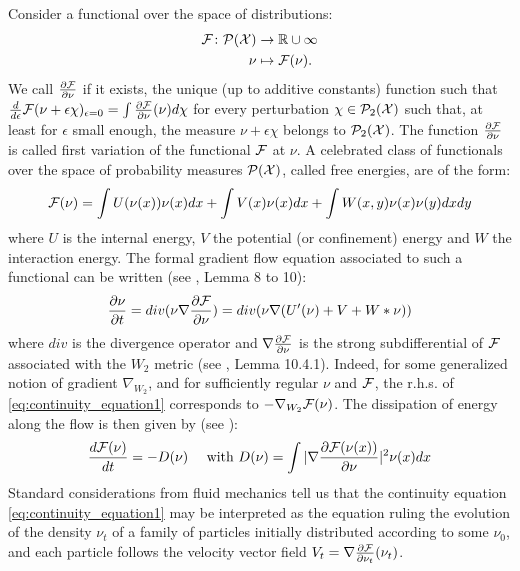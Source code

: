 Consider a functional over the space of distributions:
\begin{align*}
{{\mathcal F}} \colon \mathcal{P}({{\mathcal X}}) &\to {{\mathbb R}} \cup \infty\\
\nu &\mapsto {{\mathcal F}}(\nu).
\end{align*}
We call $\frac{\partial{{{\mathcal F}}}}{\partial{\nu}}$ if it exists, the unique (up to additive constants) function such that $\frac{d}{d\epsilon}{{\mathcal F}}(\nu+\epsilon  \chi)_{\epsilon=0}=\int\frac{\partial{{{\mathcal F}}}}{\partial{\nu}}(\nu) d\chi$ for every perturbation $\chi \in \mathcal{P}_2({{\mathcal X}})$ such that, at least for $\epsilon$ small enough, the measure $\nu +\epsilon \chi$ belongs to $\mathcal{P}_2({{\mathcal X}})$. The function $\frac{\partial{{{\mathcal F}}}}{\partial{\nu}}$ is called first variation of the functional ${{\mathcal F}}$ at $\nu$. 
A celebrated class of functionals over the space of probability measures $\mathcal{P}({{\mathcal X}})$, called free energies, are of the form:
\begin{equation}\label{eq:lyapunov}
{{\mathcal F}}(\nu)=\int U(\nu(x)) \nu(x)dx + \int V(x)\nu(x)dx + \int W(x,y)\nu(x)\nu(y)dxdy
\end{equation}
where  $U$ is the internal energy, $V$ the potential (or confinement) energy and $W$ the
interaction energy. The formal gradient flow equation associated to such a functional can be written (see \cite{carrillo2006contractions}, Lemma 8 to 10):
\begin{equation}\label{eq:continuity_equation1}
\frac{\partial \nu}{\partial t}= div( \nu \nabla \frac{\partial {{\mathcal F}}}{\partial \nu})=div( \nu \nabla (U'(\nu) + V + W * \nu))
\end{equation}
where $div$ is the divergence operator and $\nabla \frac{\partial {{\mathcal F}}}{\partial \nu}$ is the strong subdifferential of ${{\mathcal F}}$ associated with the $W_2$ metric (see \cite{ambrosio2008gradient}, Lemma 10.4.1). Indeed, for some generalized notion of gradient $\nabla_{W_2}$, and for sufficiently regular $\nu$ and ${{\mathcal F}}$, the r.h.s. of \eqref{eq:continuity_equation1} corresponds to $-\nabla_{W_2}{{\mathcal F}}(\nu)$.
The dissipation of energy along the flow is then given by (see \cite{Villani:2004}): 
\begin{align}\label{eq:dissipation_energy}
       \frac{d {{\mathcal F}}(\nu)}{dt} =-D(\nu) \quad \text{ with } D(\nu)= \int |\nabla \frac{\partial {{\mathcal F}}(\nu(x))}{\partial \nu}|^2 \nu(x)dx
\end{align}
Standard considerations from fluid mechanics tell us that the continuity equation \eqref{eq:continuity_equation1} may be interpreted as the equation ruling the evolution of the density $\nu_t$ of a family of particles initially distributed according to some $\nu_0$, and each particle follows the velocity vector field $V_t=\nabla \frac{\partial{{{\mathcal F}}}}{\partial{\nu_t}}(\nu_t)$.

